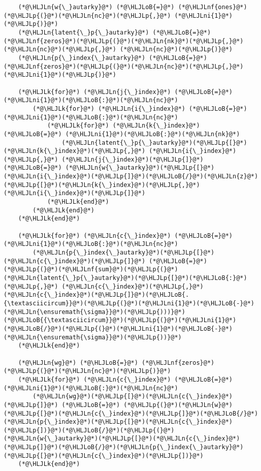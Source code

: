 \documentclass[12pt,a4paper]{article}
\newcommand{\HLJLk}[1]{\textcolor[RGB]{148,91,176}{\textbf{#1}}}
\newcommand{\HLJLn}[1]{#1}
\newcommand{\HLJLnf}[1]{\textcolor[RGB]{66,102,213}{#1}}
\newcommand{\HLJLni}[1]{\textcolor[RGB]{59,151,46}{#1}}
\newcommand{\HLJLoB}[1]{\textcolor[RGB]{102,102,102}{\textbf{#1}}}
\newcommand{\HLJLp}[1]{#1}
\begin{document}
\begin{lstlisting}
    (*@\HLJLn{w{\_}autarky}@*) (*@\HLJLoB{=}@*) (*@\HLJLnf{ones}@*)(*@\HLJLp{(}@*)(*@\HLJLn{nc}@*)(*@\HLJLp{,}@*) (*@\HLJLni{1}@*)(*@\HLJLp{)}@*)
    (*@\HLJLn{latent{\_}p{\_}autarky}@*) (*@\HLJLoB{=}@*) (*@\HLJLnf{zeros}@*)(*@\HLJLp{(}@*)(*@\HLJLn{nk}@*)(*@\HLJLp{,}@*) (*@\HLJLn{nc}@*)(*@\HLJLp{,}@*) (*@\HLJLn{nc}@*)(*@\HLJLp{)}@*)
    (*@\HLJLn{p{\_}index{\_}autarky}@*) (*@\HLJLoB{=}@*) (*@\HLJLnf{zeros}@*)(*@\HLJLp{(}@*)(*@\HLJLn{nc}@*)(*@\HLJLp{,}@*) (*@\HLJLni{1}@*)(*@\HLJLp{)}@*)

    (*@\HLJLk{for}@*) (*@\HLJLn{j{\_}index}@*) (*@\HLJLoB{=}@*) (*@\HLJLni{1}@*)(*@\HLJLoB{:}@*)(*@\HLJLn{nc}@*)
        (*@\HLJLk{for}@*) (*@\HLJLn{i{\_}index}@*) (*@\HLJLoB{=}@*) (*@\HLJLni{1}@*)(*@\HLJLoB{:}@*)(*@\HLJLn{nc}@*)
            (*@\HLJLk{for}@*) (*@\HLJLn{k{\_}index}@*) (*@\HLJLoB{=}@*) (*@\HLJLni{1}@*)(*@\HLJLoB{:}@*)(*@\HLJLn{nk}@*)
                (*@\HLJLn{latent{\_}p{\_}autarky}@*)(*@\HLJLp{[}@*)(*@\HLJLn{k{\_}index}@*)(*@\HLJLp{,}@*) (*@\HLJLn{i{\_}index}@*)(*@\HLJLp{,}@*) (*@\HLJLn{j{\_}index}@*)(*@\HLJLp{]}@*) (*@\HLJLoB{=}@*) (*@\HLJLn{w{\_}autarky}@*)(*@\HLJLp{[}@*)(*@\HLJLn{i{\_}index}@*)(*@\HLJLp{]}@*)(*@\HLJLoB{/}@*)(*@\HLJLn{z}@*)(*@\HLJLp{[}@*)(*@\HLJLn{k{\_}index}@*)(*@\HLJLp{,}@*) (*@\HLJLn{i{\_}index}@*)(*@\HLJLp{]}@*)
            (*@\HLJLk{end}@*)
        (*@\HLJLk{end}@*)
    (*@\HLJLk{end}@*)

    (*@\HLJLk{for}@*) (*@\HLJLn{c{\_}index}@*) (*@\HLJLoB{=}@*) (*@\HLJLni{1}@*)(*@\HLJLoB{:}@*)(*@\HLJLn{nc}@*)
        (*@\HLJLn{p{\_}index{\_}autarky}@*)(*@\HLJLp{[}@*)(*@\HLJLn{c{\_}index}@*)(*@\HLJLp{]}@*) (*@\HLJLoB{=}@*) (*@\HLJLp{(}@*)(*@\HLJLnf{sum}@*)(*@\HLJLp{(}@*)(*@\HLJLn{latent{\_}p{\_}autarky}@*)(*@\HLJLp{[}@*)(*@\HLJLoB{:}@*)(*@\HLJLp{,}@*) (*@\HLJLn{c{\_}index}@*)(*@\HLJLp{,}@*) (*@\HLJLn{c{\_}index}@*)(*@\HLJLp{]}@*)(*@\HLJLoB{.{\textasciicircum}}@*)(*@\HLJLp{(}@*)(*@\HLJLni{1}@*)(*@\HLJLoB{-}@*)(*@\HLJLn{\ensuremath{\sigma}}@*)(*@\HLJLp{)))}@*)(*@\HLJLoB{{\textasciicircum}}@*)(*@\HLJLp{(}@*)(*@\HLJLni{1}@*)(*@\HLJLoB{/}@*)(*@\HLJLp{(}@*)(*@\HLJLni{1}@*)(*@\HLJLoB{-}@*)(*@\HLJLn{\ensuremath{\sigma}}@*)(*@\HLJLp{))}@*)
    (*@\HLJLk{end}@*)

    (*@\HLJLn{wg}@*) (*@\HLJLoB{=}@*) (*@\HLJLnf{zeros}@*)(*@\HLJLp{(}@*)(*@\HLJLn{nc}@*)(*@\HLJLp{)}@*)
    (*@\HLJLk{for}@*) (*@\HLJLn{c{\_}index}@*) (*@\HLJLoB{=}@*) (*@\HLJLni{1}@*)(*@\HLJLoB{:}@*)(*@\HLJLn{nc}@*)
        (*@\HLJLn{wg}@*)(*@\HLJLp{[}@*)(*@\HLJLn{c{\_}index}@*)(*@\HLJLp{]}@*) (*@\HLJLoB{=}@*) (*@\HLJLp{(}@*)(*@\HLJLn{w}@*)(*@\HLJLp{[}@*)(*@\HLJLn{c{\_}index}@*)(*@\HLJLp{]}@*)(*@\HLJLoB{/}@*)(*@\HLJLn{p{\_}index}@*)(*@\HLJLp{[}@*)(*@\HLJLn{c{\_}index}@*)(*@\HLJLp{])}@*)(*@\HLJLoB{/}@*)(*@\HLJLp{(}@*)(*@\HLJLn{w{\_}autarky}@*)(*@\HLJLp{[}@*)(*@\HLJLn{c{\_}index}@*)(*@\HLJLp{]}@*)(*@\HLJLoB{/}@*)(*@\HLJLn{p{\_}index{\_}autarky}@*)(*@\HLJLp{[}@*)(*@\HLJLn{c{\_}index}@*)(*@\HLJLp{])}@*)
    (*@\HLJLk{end}@*)


\end{lstlisting}
\end{document}
